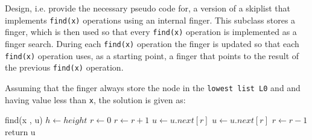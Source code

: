 \documentclass[addpoints]{exam}
\begin{document}
\begin{questions}
  Design, i.e. provide the necessary pseudo code for, a version of a skiplist that implements \texttt{find(x)} operations using an internal finger. This subclass stores a finger, which is then used so that every \texttt{find(x)} operation is implemented as a finger search. During each \texttt{find(x)} operation the finger is updated so that each \texttt{find(x)} operation uses, as a starting point, a finger that points to the result of the previous \texttt{find(x)} operation.
  \begin{solution}
    Assuming that the finger always store the node in the \texttt{lowest list L0} and and having value less than \texttt{x}, the solution is given as:
    \begin{algorithmic}
    \Statex find(x , u) 
    \Statex $h \leftarrow height$ 
    \Statex $r \leftarrow 0$ 
     
    \State $r \leftarrow r + 1$
    \EndWhile
    \State $u \leftarrow u.next[r]$
    \EndWhile
     
    \State $u \leftarrow u.next[r]$
    \EndWhile
    \State $r \leftarrow r - 1$
    \EndWhile\\
    return u
    \end{algorithmic}
  \end{solution}

\end{questions}
\end{document}
